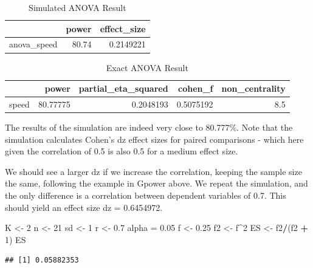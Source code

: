 \documentclass[]{book}
\newenvironment{Shaded}{\begin{snugshade}}{\end{snugshade}}
\newcommand{\DecValTok}[1]{\textcolor[rgb]{0.00,0.00,0.81}{#1}}
\newcommand{\FloatTok}[1]{\textcolor[rgb]{0.00,0.00,0.81}{#1}}
\newcommand{\NormalTok}[1]{#1}
\newcommand{\OperatorTok}[1]{\textcolor[rgb]{0.81,0.36,0.00}{\textbf{#1}}}
\newcommand{\StringTok}[1]{\textcolor[rgb]{0.31,0.60,0.02}{#1}}
\begin{document}
\begin{table}[!h]

\caption{\label{tab:unnamed-chunk-98}Simulated ANOVA Result}
\centering
\begin{tabular}{l|r|r}
\hline
  & power & effect\_size\\
\hline
anova\_speed & 80.74 & 0.2149221\\
\hline
\end{tabular}
\end{table}

\begin{table}[!h]

\caption{\label{tab:unnamed-chunk-100}Exact ANOVA Result}
\centering
\begin{tabular}{l|r|r|r|r}
\hline
  & power & partial\_eta\_squared & cohen\_f & non\_centrality\\
\hline
speed & 80.77775 & 0.2048193 & 0.5075192 & 8.5\\
\hline
\end{tabular}
\end{table}

The results of the simulation are indeed very close to 80.777\%. Note that the simulation calculates Cohen's dz effect sizes for paired comparisons - which here given the correlation of 0.5 is also 0.5 for a medium effect size.

We should see a larger dz if we increase the correlation, keeping the sample size the same, following the example in Gpower above. We repeat the simulation, and the only difference is a correlation between dependent variables of 0.7. This should yield an effect size dz = 0.6454972.

\begin{Shaded}
\begin{Highlighting}[]
\NormalTok{K <-}\StringTok{ }\DecValTok{2}
\NormalTok{n <-}\StringTok{ }\DecValTok{21}
\NormalTok{sd <-}\StringTok{ }\DecValTok{1}
\NormalTok{r <-}\StringTok{ }\FloatTok{0.7}
\NormalTok{alpha =}\StringTok{ }\FloatTok{0.05}
\NormalTok{f <-}\StringTok{ }\FloatTok{0.25}
\NormalTok{f2 <-}\StringTok{ }\NormalTok{f}\OperatorTok{^}\DecValTok{2}
\NormalTok{ES <-}\StringTok{ }\NormalTok{f2}\OperatorTok{/}\NormalTok{(f2 }\OperatorTok{+}\StringTok{ }\DecValTok{1}\NormalTok{)}
\NormalTok{ES}
\end{Highlighting}
\end{Shaded}

\begin{verbatim}
## [1] 0.05882353
\end{verbatim}
\end{document}
